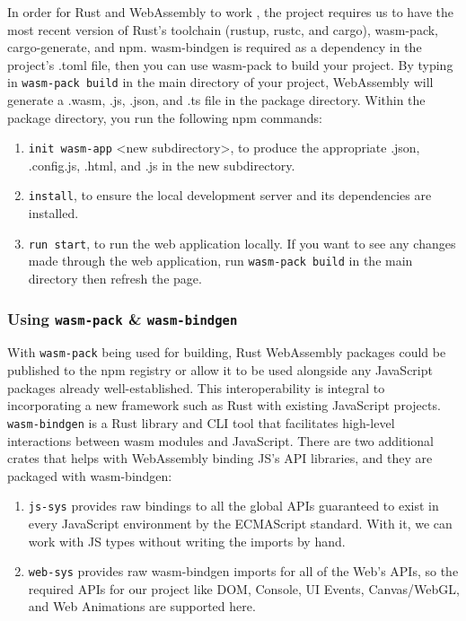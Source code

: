 \documentclass[
    paper=letter,
    parskip=half,
    fontsize=12pt,
    titlepage=firstiscover,
    toc=bibliography,
    numbers=endperiod
]{scrartcl}
\providecommand{\tightlist}{%
  \setlength{\itemsep}{0pt}\setlength{\parskip}{0pt}}
\begin{document}

In order for Rust and WebAssembly to work
\cite{wasm-game-of-life-introduction}, the project requires us to have
the most recent version of Rust's toolchain (rustup, rustc, and cargo),
wasm-pack, cargo-generate, and npm. wasm-bindgen is required as a
dependency in the project's .toml file, then you can use wasm-pack to
build your project. By typing in \texttt{wasm-pack build} in the main
directory of your project, WebAssembly will generate a .wasm, .js,
.json, and .ts file in the package directory. Within the package
directory, you run the following npm commands:

\begin{enumerate}
    \tightlist
    \item \texttt{init wasm-app} \textless new subdirectory\textgreater, to produce the
          appropriate .json, .config.js, .html, and .js in the new subdirectory.
    \item \texttt{install}, to ensure the local development server and its dependencies are
          installed.
    \item \texttt{run start}, to run the web application locally. If you want to see any
          changes made through the web application, run \texttt{wasm-pack build} in the
          main directory then refresh the page.
\end{enumerate}

\subsubsection{Using \texttt{wasm-pack} \& \texttt{wasm-bindgen}}

With \texttt{wasm-pack} \cite{wasm-pack} being used for building, Rust
WebAssembly packages could be published to the npm registry or allow it
to be used alongside any JavaScript packages already well-established.
This interoperability is integral to incorporating a new framework such
as Rust with existing JavaScript projects. \texttt{wasm-bindgen}
\cite{wasm-bindgen} is a Rust library and CLI tool that facilitates
high-level interactions between wasm modules and JavaScript. There are
two additional crates that helps with WebAssembly binding JS's API
libraries, and they are packaged with wasm-bindgen:

\begin{enumerate}
    \tightlist
    \item \texttt{js-sys} \cite{js-sys} provides raw bindings to all the global APIs guaranteed to
          exist in every JavaScript environment by the ECMAScript standard. With
          it, we can work with JS types without writing the imports by hand.
    \item \texttt{web-sys} \cite{web-sys} provides raw wasm-bindgen imports for all of the Web's
          APIs, so the required APIs for our project like DOM, Console, UI
          Events, Canvas/WebGL, and Web Animations are supported here.
\end{enumerate}
\end{document}
